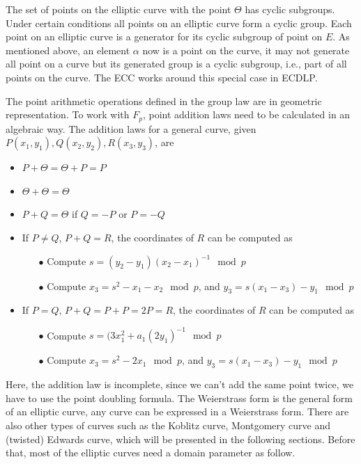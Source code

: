 The set of points on the elliptic curve with the point $\Theta$ has cyclic subgroups. Under certain conditions all points on an elliptic curve form a cyclic group. Each point on an elliptic curve is a generator for its cyclic subgroup of point on $E$. As mentioned above, an element $\alpha$ now is a point on the curve, it may not generate all point on a curve but its generated group is a cyclic subgroup, i.e., part of all points on the curve. The ECC works around this special case in ECDLP.

The point arithmetic operations defined in the group law are in geometric representation. To work with $F_p$, point addition laws need to be calculated in an algebraic way. The addition laws for a general curve, given $P(x_1, y_1), Q(x_2, y_2), R(x_3, y_3)$, are

\begin{itemize}
  \item $P + \Theta = \Theta + P = P$
  \item $\Theta + \Theta = \Theta$
  \item $P + Q = \Theta$ if $Q = -P$ or $P = -Q$
  \item If $P \neq Q$, $P + Q = R$, the coordinates of $R$ can be computed as

        \begin{itemize}
          \item[$\bullet$] Compute $s = (y_2 - y_1) (x_2 - x_1)^{-1} \mod p$
          \item[$\bullet$] Compute $x_3 = s^2 - x_1 - x_2 \mod p$, and $y_3 = s(x_1 - x_3) - y_1 \mod p$
        \end{itemize}

  \item If $P = Q$, $P + Q = P + P = 2P = R$, the coordinates of $R$ can be computed as

        \begin{itemize}
          \item[$\bullet$] Compute $s = (3x_1^2 + a_1 (2y_1)^{-1} \mod p$
          \item[$\bullet$] Compute $x_3 = s^2 - 2x_1 \mod p$, and $y_3 = s(x_1 - x_3) - y_1 \mod p$
        \end{itemize}

\end{itemize}

Here, the addition law is incomplete, since we can’t add the same point twice, we have to use the point doubling formula. The Weierstrass form is the general form of an elliptic curve, any curve can be expressed in a Weierstrass form. There are also other types of curves such as the Koblitz curve, Montgomery curve and (twisted) Edwards curve, which will be presented in the following sections. Before that, most of the elliptic curves need a domain parameter as follow.\\

